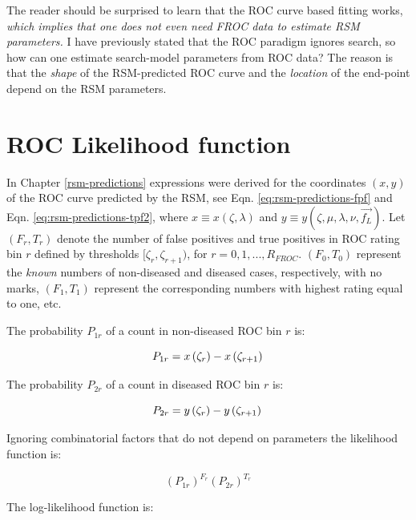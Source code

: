 \documentclass[
]{book}
\begin{document}
The reader should be surprised to learn that the ROC curve based fitting works, \emph{which implies that one does not even need FROC data to estimate RSM parameters.} I have previously stated that the ROC paradigm ignores search, so how can one estimate search-model parameters from ROC data? The reason is that the \emph{shape} of the RSM-predicted ROC curve and the \emph{location} of the end-point depend on the RSM parameters.

\hypertarget{rsm-fitting-roc-likelihood}{%
\section{ROC Likelihood function}\label{rsm-fitting-roc-likelihood}}

In Chapter \ref{rsm-predictions} expressions were derived for the coordinates \((x,y)\) of the ROC curve predicted by the RSM, see Eqn. \eqref{eq:rsm-predictions-fpf} and Eqn. \eqref{eq:rsm-predictions-tpf2}, where \(x\equiv x(\zeta,\lambda)\) and \(y \equiv y(\zeta , \mu, \lambda, \nu, \overrightarrow{f_L})\). Let \((F_r,T_r)\) denote the number of false positives and true positives in ROC rating bin \(r\) defined by thresholds \([\zeta_r, \zeta_{r+1})\), for \(r = 0, 1, ..., R_{FROC}\). \((F_0,T_0)\) represent the \emph{known} numbers of non-diseased and diseased cases, respectively, with no marks, \((F_1,T_1)\) represent the corresponding numbers with highest rating equal to one, etc.

The probability \(P_{1r}\) of a count in non-diseased ROC bin \(r\) is:

\begin{equation}
P_{1r} = x\left ( \zeta_r \right ) - x\left ( \zeta_{r+1} \right )\\ 
\label{eq:rsm-fitting-roc-p1r}
\end{equation}

The probability \(P_{2r}\) of a count in diseased ROC bin \(r\) is:

\begin{equation}
P_{2r} = y\left ( \zeta_r \right ) - y\left ( \zeta_{r+1} \right )\\ 
\label{eq:rsm-fitting-roc-p2r}
\end{equation}

Ignoring combinatorial factors that do not depend on parameters the likelihood function is:

\[\left ( P_{1r} \right )^{F_r}  \left ( P_{2r} \right )^{T_r}\]

The log-likelihood function is:
\end{document}
